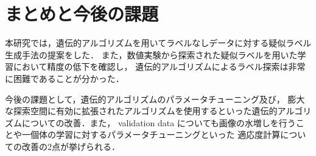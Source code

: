\newpage
\changeindent{0cm}
\section{まとめと今後の課題}
\changeindent{2cm}
本研究では，遺伝的アルゴリズムを用いてラベルなしデータに対する疑似ラベル生成手法の提案をした．
また，数値実験から探索された疑似ラベルを用いた学習において精度の低下を確認し，
遺伝的アルゴリズムによるラベル探索は非常に困難であることが分かった．

今後の課題として，遺伝的アルゴリズムのパラメータチューニング及び，
膨大な探索空間に有効に拡張されたアルゴリズムを使用するといった遺伝的アルゴリズムについての改善．また，
validation data についても画像の水増しを行うことや一個体の学習に対するパラメータチューニングといった
適応度計算についての改善の2点が挙げられる．



